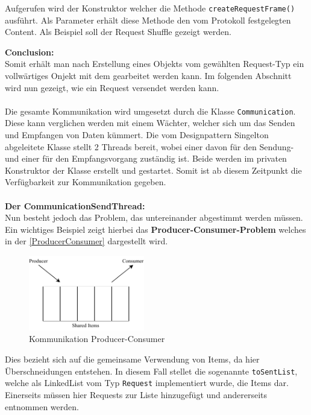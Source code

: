 Aufgerufen wird der Konstruktor welcher die Methode \lstinline[style=java]{createRequestFrame()} ausführt.
Als Parameter erhält diese Methode den vom Protokoll festgelegten Content.
Als Beispiel soll der Request Shuffle gezeigt werden.

\textbf{Conclusion:}\\
Somit erhält man nach Erstellung eines Objekts vom gewählten Request-Typ ein vollwärtiges Onjekt mit dem gearbeitet werden kann.
Im folgenden Abschnitt wird nun gezeigt, wie ein Request versendet werden kann.\\\\
Die gesamte Kommunikation wird umgesetzt durch die Klasse \lstinline[style=java]{Communication}.
Diese kann verglichen werden mit einem Wächter, welcher sich um das Senden und Empfangen von Daten kümmert.
Die vom Designpattern Singelton abgeleitete Klasse stellt 2 Threads bereit, wobei einer davon für den Sendung- und einer für den Empfangsvorgang zuständig ist.
Beide werden im privaten Konstruktor der Klasse erstellt und gestartet.
Somit ist ab diesem Zeitpunkt die Verfügbarkeit zur Kommunikation gegeben.\\\\
\textbf{Der CommunicationSendThread:}\\
Nun besteht jedoch das Problem, das  untereinander abgestimmt werden müssen.
Ein wichtiges Beispiel zeigt hierbei das \textbf{Producer-Consumer-Problem} welches in der \autoref{ProducerConsumer} dargestellt wird.
\begin{figure}[H]
\centering
\includegraphics[width=0.45\textwidth]{fig/ainf/ProducerConsumer.pdf}
\caption{Kommunikation Producer-Consumer}
\label{ProducerConsumer}
\end{figure}
Dies bezieht sich auf die gemeinsame Verwendung von Items, da hier Überschneidungen entstehen.
In diesem Fall stellet die sogenannte \lstinline[style=java]{toSentList}, welche als LinkedList vom Typ \lstinline[style=java]{Request} implementiert wurde, die Items dar.
Einerseits müssen hier Requests zur Liste hinzugefügt und andererseits entnommen werden.\\
